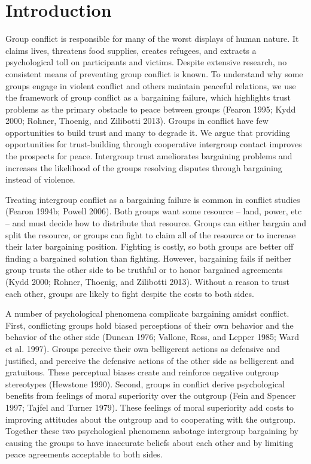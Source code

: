 \documentclass[11pt]{article}
\begin{document}
\hypertarget{introduction}{%
\section{Introduction}\label{introduction}}

Group conflict is responsible for many of the worst displays of human
nature. It claims lives, threatens food supplies, creates refugees, and
extracts a psychological toll on participants and victims. Despite
extensive research, no consistent means of preventing group conflict is
known. To understand why some groups engage in violent conflict and
others maintain peaceful relations, we use the framework of group
conflict as a bargaining failure, which highlights trust problems as the
primary obstacle to peace between groups (Fearon 1995; Kydd 2000;
Rohner, Thoenig, and Zilibotti 2013). Groups in conflict have few
opportunities to build trust and many to degrade it. We argue that
providing opportunities for trust-building through cooperative
intergroup contact improves the prospects for peace. Intergroup trust
ameliorates bargaining problems and increases the likelihood of the
groups resolving disputes through bargaining instead of violence.

Treating intergroup conflict as a bargaining failure is common in
conflict studies (Fearon 1994b; Powell 2006). Both groups want some
resource -- land, power, etc -- and must decide how to distribute that
resource. Groups can either bargain and split the resource, or groups
can fight to claim all of the resource or to increase their later
bargaining position. Fighting is costly, so both groups are better off
finding a bargained solution than fighting. However, bargaining fails if
neither group trusts the other side to be truthful or to honor bargained
agreements (Kydd 2000; Rohner, Thoenig, and Zilibotti 2013). Without a
reason to trust each other, groups are likely to fight despite the costs
to both sides.

A number of psychological phenomena complicate bargaining amidst
conflict. First, conflicting groups hold biased perceptions of their own
behavior and the behavior of the other side (Duncan 1976; Vallone, Ross,
and Lepper 1985; Ward et al. 1997). Groups perceive their own
belligerent actions as defensive and justified, and perceive the
defensive actions of the other side as belligerent and gratuitous. These
perceptual biases create and reinforce negative outgroup stereotypes
(Hewstone 1990). Second, groups in conflict derive psychological
benefits from feelings of moral superiority over the outgroup (Fein and
Spencer 1997; Tajfel and Turner 1979). These feelings of moral
superiority add costs to improving attitudes about the outgroup and to
cooperating with the outgroup. Together these two psychological
phenomena sabotage intergroup bargaining by causing the groups to have
inaccurate beliefs about each other and by limiting peace agreements
acceptable to both sides.
\end{document}
